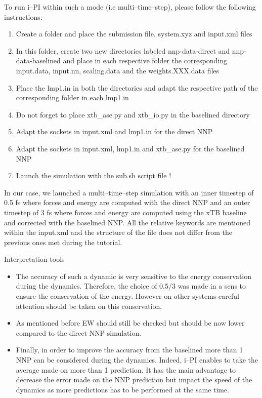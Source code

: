 \documentclass[12pt]{article}
\begin{document}
To run i--PI within such a mode (i.e multi--time--step), please follow the following instructions:
\begin{enumerate}
    \item Create a folder and place the submission file, system.xyz and input.xml files
    \item In this folder, create two new directories labeled nnp-data-direct and nnp-data-baselined and place in each respective folder the corresponding input.data, input.nn, scaling.data and the weights.XXX.data files
    \item Place the lmp1.in in both the directories and adapt the respective path of the corresponding folder in each lmp1.in
    \item Do not forget to place xtb\_ase.py and xtb\_io.py in the baselined directory
    \item Adapt the sockets in input.xml and lmp1.in for the direct NNP
    \item Adapt the sockets in input.xml, lmp1.in and xtb\_ase.py for the baselined NNP
    \item Launch the simulation with the sub.sh script file !
\end{enumerate}
In our case, we launched a multi--time--step simulation with an inner timestep of 0.5 fs where forces and energy are computed with the direct NNP and an outer timestep of 3 fs where forces and energy are computed using the xTB baseline and corrected with the baselined NNP. All the relative keywords are mentioned within the input.xml and the structure of the file does not differ from the previous ones met during the tutorial.
\begin{mybox1}{Interpretation tools}
\begin{itemize}
    \item The accuracy of such a dynamic is very sensitive to the energy conservation during the dynamics. Therefore, the choice of 0.5/3 was made in a sens to ensure the conservation of the energy. However on other systems careful attention should be taken on this conservation.
    \item As mentioned before EW should still be checked but should be now lower compared to the direct NNP simulation. 
    \item Finally, in order to improve the accuracy from the baselined more than 1 NNP can be considered during the dynamics. Indeed, i--PI enables to take the average made on more than 1 prediction. It has the main advantage to decrease the error made on the NNP prediction but impact the speed of the dynamics as more predictions has to be performed at the same time.
\end{itemize}
\end{mybox1}
\end{document}

